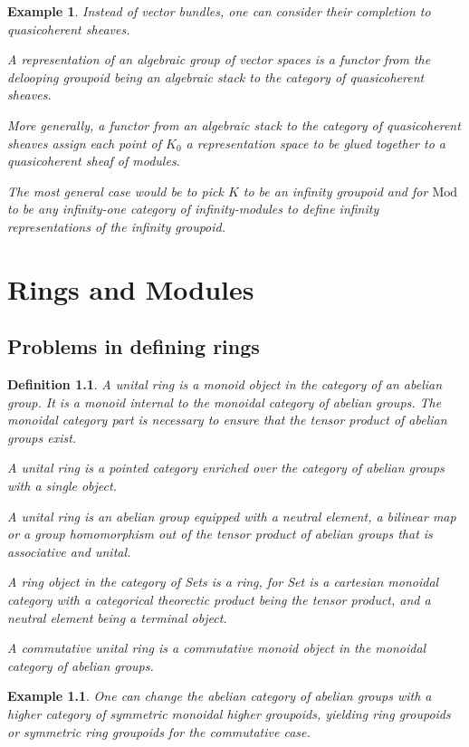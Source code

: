 \documentclass{tufte-book}
\newtheorem{definition}[theorem]{Definition}
\newtheorem{example}[theorem]{Example}
\begin{document}
\begin{example}
	Instead of vector bundles, one can consider their completion to quasicoherent sheaves.

	A representation of an algebraic group of vector spaces is a functor from the delooping groupoid being an algebraic stack to the category of quasicoherent sheaves.

	More generally, a functor from an algebraic stack to the category of quasicoherent sheaves assign each point of $K_0$ a representation space to be glued together to a quasicoherent sheaf of modules.

	The most general case would be to pick $K$ to be an infinity groupoid and for $\mathrm{Mod}$ to be any infinity-one category of infinity-modules to define infinity representations of the infinity groupoid.
\end{example}

\chapter{Rings and Modules}
\label{ch:ring}

\section{Problems in defining rings}

\begin{definition}
	A unital ring is a monoid object in the category of an abelian group. It is a monoid internal to the monoidal category of abelian groups. The monoidal category part is necessary to ensure that the tensor product of abelian groups exist.

	A unital ring is a pointed category enriched over the category of abelian groups with a single object.

	A unital ring is an abelian group equipped with a neutral element, a bilinear map or a group homomorphism out of the tensor product of abelian groups that is associative and unital.

	A ring object in the category of Sets is a ring, for Set is a cartesian monoidal category with a categorical theorectic product being the tensor product, and a neutral element being a terminal object.

	A commutative unital ring is a commutative monoid object in the monoidal category of abelian groups.
\end{definition}

\begin{example}
	One can change the abelian category of abelian groups with a higher category of symmetric monoidal higher groupoids, yielding ring groupoids or symmetric ring groupoids for the commutative case.
\end{example}
\end{document}
